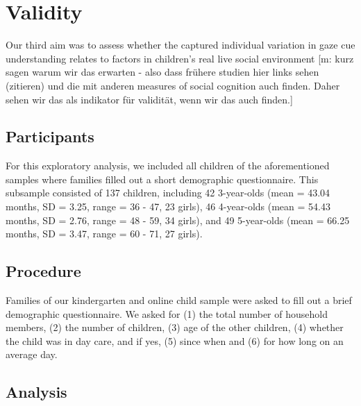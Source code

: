 \documentclass[
  man,floatsintext]{apa6}
\begin{document}
\hypertarget{validity}{%
\section{Validity}\label{validity}}

Our third aim was to assess whether the captured individual variation in gaze cue understanding relates to factors in children's real live social environment {[}m: kurz sagen warum wir das erwarten - also dass frühere studien hier links sehen (zitieren) und die mit anderen measures of social cognition auch finden. Daher sehen wir das als indikator für validität, wenn wir das auch finden.{]}

\hypertarget{participants-2}{%
\subsection{Participants}\label{participants-2}}

For this exploratory analysis, we included all children of the aforementioned samples where families filled out a short demographic questionnaire. This subsample consisted of
137 children, including
42 3-year-olds
(mean = 43.04 months,
SD = 3.25,
range = 36
- 47,
23 girls),
46 4-year-olds
(mean = 54.43 months,
SD = 2.76,
range = 48
- 59,
34 girls),
and 49 5-year-olds
(mean = 66.25 months,
SD = 3.47,
range = 60
- 71,
27 girls).

\hypertarget{procedure-2}{%
\subsection{Procedure}\label{procedure-2}}

Families of our kindergarten and online child sample were asked to fill out a brief demographic questionnaire. We asked for (1) the total number of household members, (2) the number of children, (3) age of the other children, (4) whether the child was in day care, and if yes, (5) since when and (6) for how long on an average day.

\hypertarget{analysis-2}{%
\subsection{Analysis}\label{analysis-2}}
\end{document}
